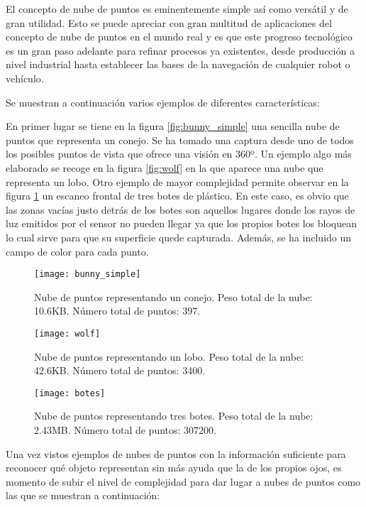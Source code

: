 El concepto de nube de puntos es eminentemente simple así como versátil y de gran utilidad. Esto se puede apreciar con gran multitud de aplicaciones del concepto de nube de puntos en el mundo real y es que este progreso tecnológico es un gran paso adelante para refinar procesos ya existentes, desde producción a nivel industrial hasta establecer las bases de la navegación de cualquier robot o vehículo.

Se muestran a continuación varios ejemplos de diferentes características:

En primer lugar se tiene en la figura \ref{fig:bunny_simple} una sencilla nube de puntos que representa un conejo. Se ha tomado una captura desde uno de todos los posibles puntos de vista que ofrece una visión en 360º.
Un ejemplo algo más elaborado se recoge en la figura \ref{fig:wolf} en la que aparece una nube que representa un lobo. 
Otro ejemplo de mayor complejidad permite observar en la figura \ref{fig:botes} un escaneo frontal de tres botes de plástico. En este caso, es obvio que las zonas vacías justo detrás de los botes son aquellos lugares donde los rayos de luz emitidos por el sensor no pueden llegar ya que los propios botes los bloquean lo cual sirve para que su superficie quede capturada. Además, se ha incluido un campo de color para cada punto.


\begin{figure}[!htb]
  \texttt{[image: bunny\_simple]}
  \caption{Nube de puntos representando un conejo.
  Peso total de la nube: 10.6KB.
  Número total de puntos: 397.}\label{fig:bunny_simple}
\endminipage\hfill
{}
  \texttt{[image: wolf]}
  \caption{Nube de puntos representando un lobo.
  Peso total de la nube: 42.6KB.
  Número total de puntos: 3400.}\label{fig:wolf}
\endminipage\hfill
{}%
  \texttt{[image: botes]}
  \caption{Nube de puntos representando tres botes.
  Peso total de la nube: 2.43MB.
  Número total de puntos: 307200.}\label{fig:botes}
\endminipage
\end{figure}



Una vez vistos ejemplos de nubes de puntos con la información suficiente para reconocer qué objeto representan sin más ayuda que la de los propios ojos, es momento de subir el nivel de complejidad para dar lugar a nubes de puntos como las que se muestran a continuación:

